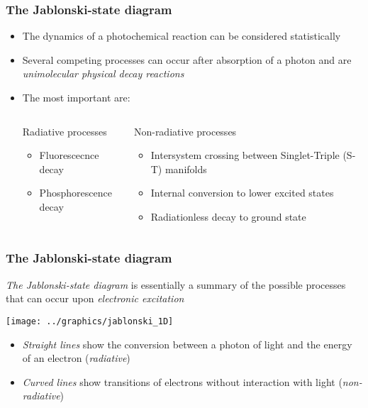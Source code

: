 \documentclass[ignorenonframetext]{beamer}
\begin{document}
\begin{frame}
	\frametitle{The Jablonski-state diagram}
	\begin{itemize}
		\item The dynamics of a photochemical reaction can be considered statistically
		\item Several competing processes can occur after absorption of a photon and are \emph{unimolecular physical decay 			reactions}
		\item The most important are:
			\begin{columns}[t]
					\begin{block}{Radiative processes}
						\begin{itemize}
							\item Fluorescecnce decay
							\item Phosphorescence decay
						\end{itemize}
					\end{block}
					\begin{block}{Non-radiative processes}
						\begin{itemize}
							\item Intersystem crossing between Singlet-Triple (S-T) manifolds
							\item Internal conversion to lower excited states
							\item Radiationless decay to ground state
						\end{itemize}
					\end{block}
			\end{columns}

	\end{itemize}
\end{frame}
		
\begin{frame}
	\frametitle{The Jablonski-state diagram}
	\parbox{\textwidth}{\emph{The Jablonski-state diagram} is essentially a summary of the possible processes that can 					occur upon 	\emph{electronic excitation}}
	\texttt{[image: ../graphics/jablonski\_1D]}
	\begin{itemize}
		\item \emph{Straight lines} show the conversion between a photon of light and the energy of an electron 							(\emph{radiative})
		\item \emph{Curved lines} show transitions of electrons without interaction with light (\emph{non-radiative})
	\end{itemize}
\end{frame}
\end{document}
